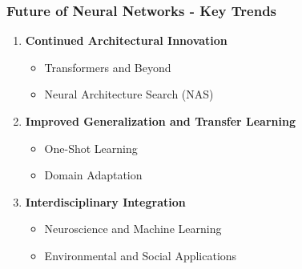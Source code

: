\documentclass{beamer}
\begin{document}
\begin{frame}[fragile]
    \frametitle{Future of Neural Networks - Key Trends}
    \begin{enumerate}
        \item \textbf{Continued Architectural Innovation}
        \begin{itemize}
            \item Transformers and Beyond
            \item Neural Architecture Search (NAS)
        \end{itemize}
        
        \item \textbf{Improved Generalization and Transfer Learning}
        \begin{itemize}
            \item One-Shot Learning
            \item Domain Adaptation
        \end{itemize}
        
        \item \textbf{Interdisciplinary Integration}
        \begin{itemize}
            \item Neuroscience and Machine Learning
            \item Environmental and Social Applications
        \end{itemize}
    \end{enumerate}
\end{frame}
\end{document}
